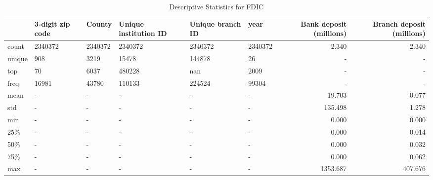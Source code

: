 \begin{table}
\centering
\caption{Descriptive Statistics for FDIC}
\label{tab:des}
\begin{tabular}{llllllrr}
\toprule
{} & 3-digit zip code &   County & Unique institution ID & Unique branch ID &     year &  Bank deposit (millions) &  Branch deposit (millions) \\
\midrule
count  &          2340372 &  2340372 &               2340372 &          2340372 &  2340372 &                    2.340 &                      2.340 \\
unique &              908 &     3219 &                 15478 &           144878 &       26 &                        - &                          - \\
top    &               70 &     6037 &                480228 &              nan &     2009 &                        - &                          - \\
freq   &            16981 &    43780 &                110133 &           224524 &    99304 &                        - &                          - \\
mean   &                - &        - &                     - &                - &        - &                   19.703 &                      0.077 \\
std    &                - &        - &                     - &                - &        - &                  135.498 &                      1.278 \\
min    &                - &        - &                     - &                - &        - &                    0.000 &                      0.000 \\
25\%    &                - &        - &                     - &                - &        - &                    0.000 &                      0.014 \\
50\%    &                - &        - &                     - &                - &        - &                    0.000 &                      0.032 \\
75\%    &                - &        - &                     - &                - &        - &                    0.000 &                      0.062 \\
max    &                - &        - &                     - &                - &        - &                 1353.687 &                    407.676 \\
\bottomrule
\end{tabular}
\end{table}
